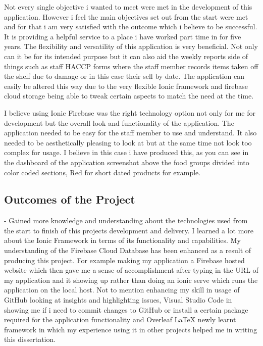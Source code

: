 Not every single objective i wanted to meet were met in the development of this application. However i feel the main objectives set out from the start were met and for that i am very satisfied with the outcome which i believe to be successful. It is providing a helpful service to a place i have worked part time in for five years. The flexibility and versatility of this application is very beneficial. Not only can it be for its intended purpose but it can also aid the weekly reports side of things such as staff HACCP forms where the staff member records items taken off the shelf due to damage or in this case their sell by date. The application can easily be altered this way due to the very flexible Ionic framework and firebase cloud storage being able to tweak certain aspects to match the need at the time. 
\newline

I believe using Ionic Firebase was the right technology option not only for me for development but the overall look and functionality of the application. The application needed to be easy for the staff member to use and understand. It also needed to be aesthetically pleasing to look at but at the same time not look too complex for usage. I believe in this case i have produced this, as you can see in the dashboard of the application screenshot above the food groups divided into color coded sections, Red for short dated products for example. 
\newline

\subsection{Outcomes of the Project}
- Gained more knowledge and understanding about the technologies used from the start to finish of this projects development and delivery. I learned a lot more about the Ionic Framework in terms of its functionality and capabilities. My understanding of the Firebase Cloud Database has been enhanced as a result of producing this project. For example making my application a Firebase hosted website which then gave me a sense of accomplishment after typing in the URL of my application and it showing up rather than doing an ionic serve which runs the application on the local host. Not to mention enhancing my skill in usage of GitHub looking at insights and highlighting issues, Visual Studio Code in showing me if i need to commit changes to GitHub or install a certain package required for the application functionality and Overleaf LaTeX newly learnt framework in which my experience using it in other projects helped me in writing this dissertation.
\newline

